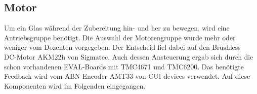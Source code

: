 \clearpage
\subsection{Motor}
\label{subsec:Motor}

Um ein Glas während der Zubereitung hin- und her zu bewegen, wird eine Antriebsgruppe benötigt. Die Auswahl der Motorengruppe wurde mehr oder weniger vom Dozenten vorgegeben. Der Entscheid fiel dabei auf den Brushless DC-Motor AKM22h von Sigmatec. Auch dessen Ansteuerung ergab sich durch die schon vorhandenen EVAL-Boards mit TMC4671 und TMC6200. Das benötigte Feedback wird vom ABN-Encoder AMT33 von CUI devices verwendet. Auf diese Komponenten wird im Folgenden eingegangen.